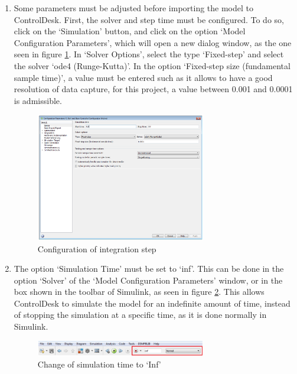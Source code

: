 \begin{enumerate}
    
    \item  Some parameters must be adjusted before importing the model to ControlDesk. First, the solver and step time must be configured. To do so, click on the ‘Simulation’ button, and click on the option ‘Model Configuration Parameters’, which will open a new dialog window, as the one seen in figure \ref{fig6}. In ‘Solver Options’, select the type ‘Fixed-step’ and select the solver ‘ode4 (Runge-Kutta)’. In the option ‘Fixed-step size (fundamental sample time)’, a value must be entered such as it allows to have a good resolution of data capture, for this project, a value between 0.001 and 0.0001 is admissible.
    \begin{figure}[H]
        \centering
        \includegraphics[width=0.7\textwidth]{Images/Ball and Bean/MatLab5.png}
        \caption{Configuration of integration step}
        \label{fig6}
    \end{figure}

    \item The option ‘Simulation Time’ must be set to ‘inf’. This can be done in the option ‘Solver’ of the ‘Model Configuration Parameters’ window, or in the box shown in the toolbar of Simulink, as seen in figure \ref{fig7}. This allows ControlDesk to simulate the model for an indefinite amount of time, instead of stopping the simulation at a specific time, as it is done normally in Simulink.
    \begin{figure}[H]
        \centering
        \includegraphics[width=0.7\textwidth]{Images/Ball and Bean/MatLab6.png}
        \caption{Change of simulation time to ‘Inf’}
        \label{fig7}
    \end{figure}


\end{enumerate}
